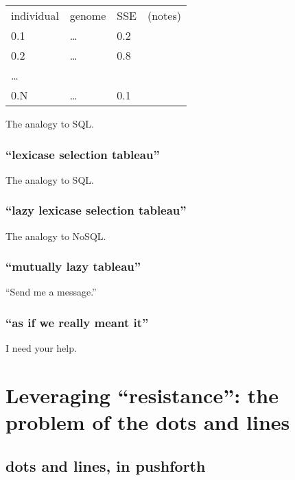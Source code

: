 \begin{longtable}{|l|l|l|l|}
\hline
individual & genome & SSE & (notes)\\
0.1 & \ldots{} & 0.2 & \\
0.2 & \ldots{} & 0.8 & \\
\ldots{} &  &  & \\
0.N & \ldots{} & 0.1 & \\
\hline
\end{longtable}

The analogy to SQL.

\subsubsection{``lexicase selection tableau''}\hypertarget{lexicase-selection-tableau}{}\label{lexicase-selection-tableau}

The analogy to SQL.

\subsubsection{``lazy lexicase selection tableau''}\hypertarget{lazy-lexicase-selection-tableau}{}\label{lazy-lexicase-selection-tableau}

The analogy to NoSQL.

\subsubsection{``mutually lazy tableau''}\hypertarget{mutually-lazy-tableau}{}\label{mutually-lazy-tableau}

``Send me a message.''

\subsubsection{``as if we really meant it''}\hypertarget{as-if-we-really-meant-it-1}{}\label{as-if-we-really-meant-it-1}

I need your help.

\section{Leveraging ``resistance'': the problem of the dots and lines}\hypertarget{leveraging-resistance-the-problem-of-the-dots-and-lines}{}\label{leveraging-resistance-the-problem-of-the-dots-and-lines}

\subsection{dots and lines, in pushforth}\hypertarget{dots-and-lines-in-pushforth}{}\label{dots-and-lines-in-pushforth}

